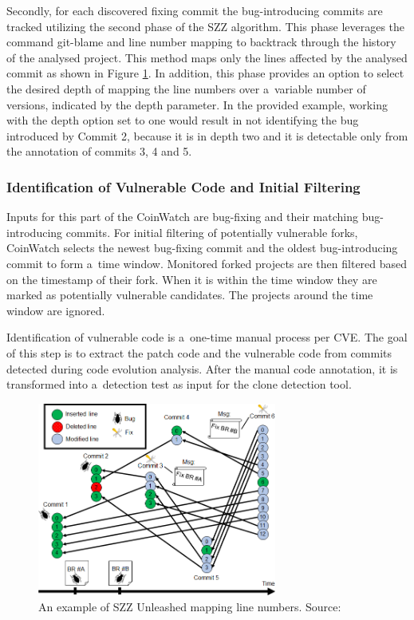     Secondly, for each discovered fixing commit the bug-introducing commits are tracked utilizing the second
    phase of the SZZ algorithm. This phase leverages the command git-blame and line number mapping to backtrack
    through the history of the analysed project. This method maps only the lines affected by the
    analysed commit as shown in Figure \ref{szz-line-map}. In addition, this phase provides an option to
    select the desired depth of mapping the line numbers over a~variable number of versions, indicated by
    the depth parameter. In the provided example, working with the depth option set to one would result in
    not identifying the bug introduced by Commit 2, because it is in depth two and it is detectable only from
    the annotation of commits 3, 4 and 5.

    \subsubsection*{Identification of Vulnerable Code and Initial Filtering}
    Inputs for this part of the CoinWatch are bug-fixing and their matching bug-introducing commits.
    For initial filtering of potentially vulnerable forks, CoinWatch selects the newest bug-fixing commit
    and the oldest bug-introducing commit to form a~time window. Monitored forked projects are then filtered
    based on the timestamp of their fork. When it is within the time window they are marked as potentially
    vulnerable candidates. The projects around the time window are ignored.

    Identification of vulnerable code is a~one-time manual process per CVE. The goal of this step is to
    extract the patch code and the vulnerable code from commits detected during code evolution analysis.
    After the manual code annotation, it is transformed into a~detection test as input for the clone detection
    tool.

    \begin{figure}[h]
      \centering
      \includegraphics[width=0.7\textwidth]{obrazky-figures/szz_line_mapping.png}
      \caption{An example of SZZ Unleashed mapping line numbers. Source:~\cite{SZZunleashed}}
      \label{szz-line-map}
    \end{figure}

